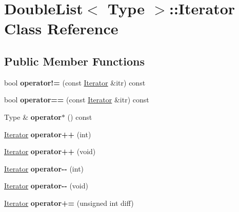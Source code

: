 \hypertarget{classDoubleList_1_1Iterator}{}\section{Double\+List$<$ Type $>$\+:\+:Iterator Class Reference}
\label{classDoubleList_1_1Iterator}
\subsection*{Public Member Functions}
\begin{DoxyCompactItemize}
\item 
\mbox{\label{classDoubleList_1_1Iterator_aafc9b4570d16cd636b04c9b69d82b66c}} 
bool {\bfseries operator!=} (const \hyperlink{classDoubleList_1_1Iterator}{Iterator} \&itr) const
\item 
\mbox{\label{classDoubleList_1_1Iterator_a2e4afd4fba6fa94c2fe3eca0b513c6f6}} 
bool {\bfseries operator==} (const \hyperlink{classDoubleList_1_1Iterator}{Iterator} \&itr) const
\item 
\mbox{\label{classDoubleList_1_1Iterator_a7461f915611d1696e6b633a265c794e4}} 
Type \& {\bfseries operator$\ast$} () const
\item 
\mbox{\label{classDoubleList_1_1Iterator_a9dbcee680a81658b47a1e39a4a70b647}} 
\hyperlink{classDoubleList_1_1Iterator}{Iterator} {\bfseries operator++} (int)
\item 
\mbox{\label{classDoubleList_1_1Iterator_a753e191102f9418a7519346d88bb7e64}} 
\hyperlink{classDoubleList_1_1Iterator}{Iterator} {\bfseries operator++} (void)
\item 
\mbox{\label{classDoubleList_1_1Iterator_a5a07b768bba748989d98d929699554fd}} 
\hyperlink{classDoubleList_1_1Iterator}{Iterator} {\bfseries operator-\/-\/} (int)
\item 
\mbox{\label{classDoubleList_1_1Iterator_aa0266dd5255e32169e22846d04b83f8b}} 
\hyperlink{classDoubleList_1_1Iterator}{Iterator} {\bfseries operator-\/-\/} (void)
\item 
\mbox{\label{classDoubleList_1_1Iterator_a2e3d2c2bf3e578bb022a0e32113c7e01}} 
\hyperlink{classDoubleList_1_1Iterator}{Iterator} {\bfseries operator+=} (unsigned int diff)
\end{DoxyCompactItemize}
